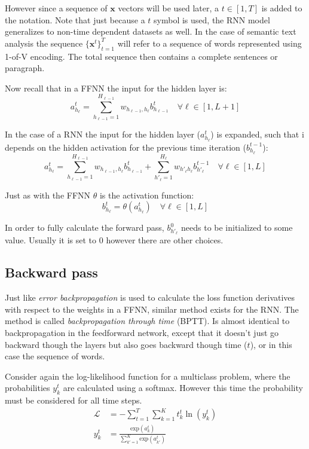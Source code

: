 However since a sequence of $\mathbf{x}$ vectors will be used later, a $t \in [1, T]$ is added to the notation. Note that just because a $t$ symbol is used, the RNN model generalizes to non-time dependent datasets as well. In the case of semantic text analysis the sequence $\{\mathbf{x}^t\}_{t=1}^T$ will refer to a sequence of words represented using 1-of-V encoding. The total sequence then contains a complete sentences or paragraph. 

Now recall that in a FFNN the input for the hidden layer is:
\begin{equation}
a_{h_\ell}^t = \sum_{h_{\ell-1}=1}^{H_{\ell-1}} w_{h_{\ell-1}, h_\ell} b_{h_{\ell-1}}^t \quad \forall \ell \in [1, L+1]
\end{equation}

In the case of a RNN the input for the hidden layer ($a_{h_\ell}^t$) is expanded, such that i depends on the hidden activation for the previous time iteration ($b_{h_\ell}^{t-1}$):
\begin{equation}
a_{h_\ell}^t = \sum_{h_{\ell-1}=1}^{H_{\ell-1}} w_{h_{\ell-1}, h_\ell} b_{h_{\ell-1}}^t + \sum_{h'_\ell=1}^{H_\ell} w_{h'_\ell h_\ell} b_{h'_\ell}^{t-1} \quad \forall \ell \in [1, L]
\end{equation}

Just as with the FFNN $\theta$ is the activation function:
\begin{equation}
b_{h_\ell}^t = \theta(a_{h_\ell}^t) \quad \forall \ell \in [1, L]
\end{equation}

In order to fully calculate the forward pass, $b_{h'_\ell}^0$ needs to be initialized to some value. Usually it is set to $0$ however there are other choices.

\subsection{Backward pass}

Just like \textit{error backpropagation} is used to calculate the loss function derivatives with respect to the weights in a FFNN, similar method exists for the RNN. The method is called \textit{backpropagation through time} (BPTT). Is almost identical to backpropagation in the feedforward network, except that it doesn't just go backward though the layers but also goes backward though time ($t$), or in this case the sequence of words. \cite{alexgraves}

Consider again the log-likelihood function for a multiclass problem, where the probabilities $y_k^t$ are calculated using a softmax. However this time the probability must be considered for all time steps.
\begin{align}
\mathcal{L} &= - \sum_{t=1}^T \sum_{k=1}^K t_k^t \ln(y_k^t) \\
y_k^t &= \frac{\mathrm{exp}(a_k^t)} {\sum_{k'=1}^K \mathrm{exp}(a_{k'}^t)}
\end{align}

